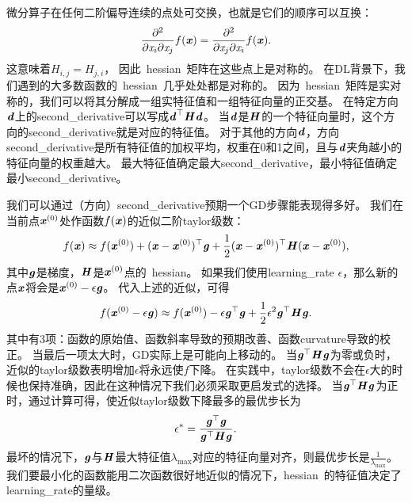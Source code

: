 
微分算子在任何二阶偏导连续的点处可交换，也就是它们的顺序可以互换：
\begin{align}
 \frac{\partial^2}{\partial \Sx_i \partial \Sx_j} f(\Vx) = \frac{\partial^2}{\partial \Sx_j\partial \Sx_i} f(\Vx) .
\end{align}
这意味着$H_{i,j} = H_{j,i}$， 因此~\gls{hessian}~矩阵在这些点上是对称的。
在\gls{DL}背景下，我们遇到的大多数函数的~\gls{hessian}~几乎处处都是对称的。
因为~\gls{hessian}~矩阵是实对称的，我们可以将其分解成一组实特征值和一组特征向量的正交基。
在特定方向$\Vd$上的\gls{second_derivative}可以写成$\Vd^\Tsp \MH \Vd$。
当$\Vd$是$\MH$的一个特征向量时，这个方向的\gls{second_derivative}就是对应的特征值。
对于其他的方向$\Vd$，方向\gls{second_derivative}是所有特征值的加权平均，权重在0和1之间，且与$\Vd$夹角越小的特征向量的权重越大。
最大特征值确定最大\gls{second_derivative}，最小特征值确定最小\gls{second_derivative}。


我们可以通过（方向）\gls{second_derivative}预期一个\gls{GD}步骤能表现得多好。
我们在当前点$\Vx^{(0)}$处作函数$f(\Vx)$的近似二阶\gls{taylor}级数：
\begin{align}
 f(\Vx) \approx f(\Vx^{(0)}) + (\Vx - \Vx^{(0)})^\Tsp \Vg + 
 \frac{1}{2}  (\Vx - \Vx^{(0)})^\Tsp \MH  (\Vx - \Vx^{(0)}),
\end{align}
其中$\Vg$是梯度，$\MH$是$ \Vx^{(0)}$点的~\gls{hessian}。
如果我们使用\gls{learning_rate} $\epsilon$，那么新的点$\Vx$将会是$\Vx^{(0)}-\epsilon \Vg$。
代入上述的近似，可得
\begin{align}
\label{eq:4.9}
 f(\Vx^{(0)} - \epsilon \Vg ) \approx f(\Vx^{(0)})  - \epsilon \Vg^\Tsp \Vg + \frac{1}{2} \epsilon^2 \Vg^\Tsp \MH  \Vg.
\end{align}
其中有3项：函数的原始值、函数斜率导致的预期改善、函数\gls{curvature}导致的校正。
当最后一项太大时，\gls{GD}实际上是可能向上移动的。
当$\Vg^\Tsp \MH  \Vg$为零或负时，近似的\gls{taylor}级数表明增加$\epsilon$将永远使$f$下降。
在实践中，\gls{taylor}级数不会在$\epsilon$大的时候也保持准确，因此在这种情况下我们必须采取更启发式的选择。
当$\Vg^\Tsp \MH  \Vg$为正时，通过计算可得，使近似\gls{taylor}级数下降最多的最优步长为
\begin{align}
 \epsilon^* = \frac{ \Vg^\Tsp \Vg}{ \Vg^\Tsp \MH  \Vg} .
\end{align}
最坏的情况下，$\Vg$与$\MH$最大特征值$\lambda_{\max}$对应的特征向量对齐，则最优步长是$\frac{1}{\lambda_{\max}}$。
我们要最小化的函数能用二次函数很好地近似的情况下，\gls{hessian}~的特征值决定了\gls{learning_rate}的量级。

